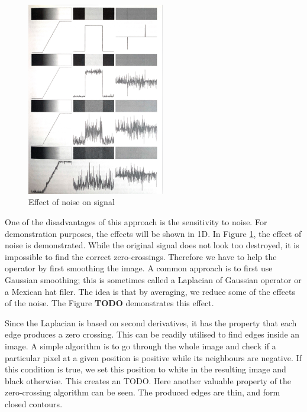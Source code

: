 \documentclass[
  digital,     %
  oneside,     %
  nosansbold,  %
  nocolorbold, %
  lof,         %
  lot,         %
]{fithesis4}
\begin{document}

\begin{figure}
    \begin{center}
        \includegraphics[width=6cm]{"resources/gonzalez_edges_and_noise.jpg"}
    \end{center}
    \caption{Effect of noise on signal \parencite{gonzalez2002}}
    \label{fig:edges_noise}
\end{figure}

One of the disadvantages of this approach is the sensitivity to noise. For
demonstration purposes, the effects will be shown in 1D. In Figure
\ref{fig:edges_noise}, the effect of noise is demonstrated. While the original
signal does not look too destroyed, it is impossible to find the correct
zero-crossings. Therefore we have to help the operator by first smoothing the
image. A common approach is to first use Gaussian smoothing; this is sometimes
called a Laplacian of Gaussian operator or a Mexican hat filer. The idea is that
by averaging, we reduce some of the effects of the noise. The Figure \textbf{TODO}
demonstrates this effect.

Since the Laplacian is based on second derivatives, it has the property that
each edge produces a zero crossing. This can be readily utilised to find edges
inside an image. A simple algorithm is to go through the whole image and check
if a particular pixel at a given position is positive while its neighbours are
negative. If this condition is true, we set this position to white in the
resulting image and black otherwise. This creates an TODO. Here another valuable
property of the zero-crossing algorithm can be seen. The produced edges are
thin, and form closed contours.
\end{document}
